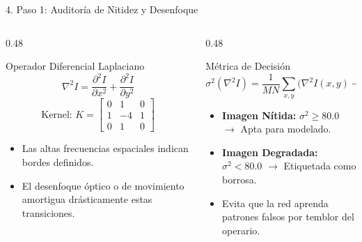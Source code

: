 \documentclass[aspectratio=169,10pt]{beamer}
\begin{document}
\begin{frame}{4. Paso 1: Auditoría de Nitidez y Desenfoque}
    \begin{columns}[T]
        \begin{column}{0.48\textwidth}
            \begin{block}{Operador Diferencial Laplaciano}
                $$\nabla^2 I = \frac{\partial^2 I}{\partial x^2} + \frac{\partial^2 I}{\partial y^2}$$
                $$\text{Kernel: } K = \begin{bmatrix} 0 & 1 & 0 \\ 1 & -4 & 1 \\ 0 & 1 & 0 \end{bmatrix}$$
                \begin{itemize}
                    \item Las altas frecuencias espaciales indican bordes definidos.
                    \item El desenfoque óptico o de movimiento amortigua drásticamente estas transiciones.
                \end{itemize}
            \end{block}
        \end{column}
        
        \begin{column}{0.48\textwidth}
            \begin{exampleblock}{Métrica de Decisión}
                $$\sigma^2(\nabla^2 I) = \frac{1}{MN}\sum_{x,y}\Big(\nabla^2 I(x,y) - \mu\Big)^2$$
                \begin{itemize}
                    \item \textbf{Imagen Nítida:} $\sigma^2 \ge 80.0$ $\rightarrow$ Apta para modelado.
                    \item \textbf{Imagen Degradada:} $\sigma^2 < 80.0$ $\rightarrow$ Etiquetada como borrosa.
                    \item Evita que la red aprenda patrones falsos por temblor del operario.
                \end{itemize}
            \end{exampleblock}
        \end{column}
    \end{columns}
\end{frame}
\end{document}

